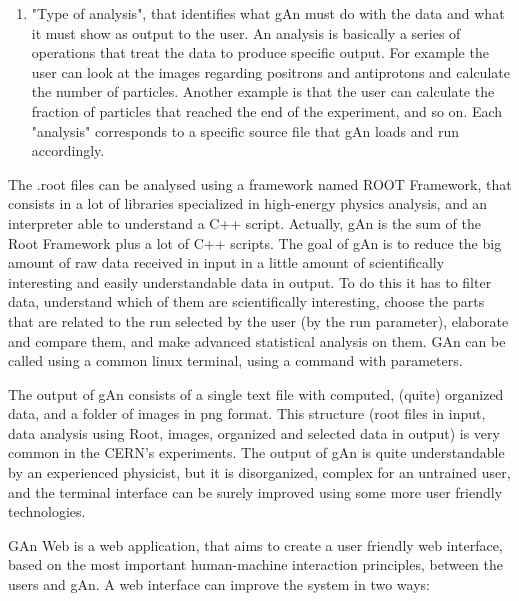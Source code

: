 \begin{enumerate}
\item "Type of analysis", that identifies what gAn must do with the data and what it must show as output to the user.
An analysis is basically a series of operations that treat the data to produce specific output. For example the user can look at the images regarding positrons and antiprotons and calculate the number of particles. Another example is that the user can calculate the fraction of particles that reached the end of the experiment, and so on. Each "analysis" corresponds to a specific source file that gAn loads and run accordingly.

\end{enumerate}


The .root files can be analysed using a framework named ROOT Framework, that consists in a lot of libraries specialized in high-energy physics analysis, and an interpreter able to understand a C++ script.
Actually, gAn is the sum of the Root Framework plus a lot of C++ scripts.
The goal of gAn is to reduce the big amount of raw data received in input in a little amount of scientifically interesting and easily understandable data in output. To do this it has to filter data, understand which of them are scientifically interesting, choose the parts that are related to the run selected by the user (by the run parameter), elaborate and compare them, and make advanced statistical analysis on them.  
GAn can be called using a common linux terminal, using a command with parameters. 

The output of gAn consists of a single text file with computed, (quite) organized data, and a folder of images in png format.
This structure (root files in input, data analysis using Root, images, organized and selected data in output) is very common in the CERN's experiments. 
The output of gAn is quite understandable by an experienced physicist, but it is disorganized, complex for an untrained user, and the terminal interface can be surely improved using some more user friendly technologies.

GAn Web is a web application, that aims to create a user friendly web interface, based on the most important human-machine interaction principles, between the users and gAn.
A web interface can improve the system in two ways:

